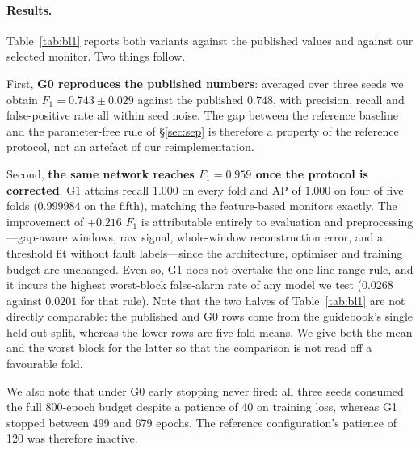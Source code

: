 \documentclass{article}
\begin{document}
\paragraph{Results.} Table~\ref{tab:bl1} reports both variants against the
published values and against our selected monitor. Two things follow.

First, \textbf{G0 reproduces the published numbers}: averaged over three
seeds we obtain $F_1 = 0.743 \pm 0.029$ against the published $0.748$, with
precision, recall and false-positive rate all within seed noise. The gap
between the reference baseline and the parameter-free rule of
\S\ref{sec:sep} is therefore a property of the reference protocol, not an
artefact of our reimplementation.

Second, \textbf{the same network reaches $F_1 = 0.959$ once the protocol is
corrected}. G1 attains recall $1.000$ on every fold and AP of $1.000$ on four
of five folds ($0.999984$ on the fifth),
matching the feature-based monitors exactly. The improvement of $+0.216$ $F_1$
is attributable entirely to evaluation and preprocessing---gap-aware windows,
raw signal, whole-window reconstruction error, and a threshold fit without
fault labels---since the architecture, optimiser and training budget are
unchanged. Even so, G1 does not overtake the one-line range rule, and it
incurs the highest worst-block false-alarm rate of any model we test
($0.0268$ against $0.0201$ for that rule). Note that the two halves of
Table~\ref{tab:bl1} are not directly comparable: the published and G0 rows
come from the guidebook's single held-out split, whereas the lower rows are
five-fold means. We give both the mean and the worst block for the latter so
that the comparison is not read off a favourable fold.

We also note that under G0 early stopping never fired: all three seeds
consumed the full 800-epoch budget despite a patience of 40 on training loss,
whereas G1 stopped between 499 and 679 epochs. The reference configuration's
patience of 120 was therefore inactive.
\end{document}
